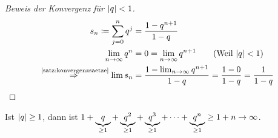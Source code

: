 \begin{beispiel}

    \begin{proof}[Beweis der Konvergenz für $\left\lvert q\right\rvert < 1$]
        \marginnote{[5. Dez]}
        \begin{align*}
            s_n\definedas \sum_{j=0}^{n} q^j &= \frac{1-q^{n+1}}{1-q}\\
            \lim_{n\fromto\infty} q^n &= 0 = \lim_{n\fromto\infty} q^{n+1}\tag{Weil $\abs{q} < 1$}\\
            \annot{\impl}{\ref{satz:konvergenzsaetze}} \lim s_n &= \frac{1-\lim_{n\fromto\infty} q^{n+1}}{1-q} = \frac{1-0}{1-q} = \frac{1}{1-q}\qedhere
        \end{align*}
    \end{proof}
    \begin{bemerkung}
        Ist $\left\lvert q\right\rvert\geq 1$, dann ist $1+\underbrace{q}_{\geq 1}+\underbrace{q^2}_{\geq 1}+\underbrace{q^3}_{\geq 1}+\dots + \underbrace{q^n}_{\geq 1} \geq 1+n\rightarrow{}\infty$.
    \end{bemerkung}
\end{beispiel}

